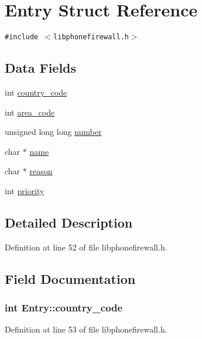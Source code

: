 \hypertarget{structEntry}{
\section{Entry Struct Reference}
\label{structEntry}
}
{\tt \#include $<$libphonefirewall.h$>$}

\subsection*{Data Fields}
\begin{CompactItemize}
\item 
int \hyperlink{structEntry_138b4e79687ff5ff6de4554db0f061fd}{country\_\-code}
\item 
int \hyperlink{structEntry_9de7b96e5b65796bd35e9dc730dcd8b3}{area\_\-code}
\item 
unsigned long long \hyperlink{structEntry_1f2177afed89936f82c130ae13fb107c}{number}
\item 
char $\ast$ \hyperlink{structEntry_272e382d3efed5f970c7939742ec9603}{name}
\item 
char $\ast$ \hyperlink{structEntry_2082cdbb815dfa8b81309cd395d32986}{reason}
\item 
int \hyperlink{structEntry_85af261b3171c257892b54a7200da061}{priority}
\end{CompactItemize}


\subsection{Detailed Description}


Definition at line 52 of file libphonefirewall.h.

\subsection{Field Documentation}
\hypertarget{structEntry_138b4e79687ff5ff6de4554db0f061fd}{
\subsubsection{\setlength{\rightskip}{0pt plus 5cm}int {\bf Entry::country\_\-code}}}
\label{structEntry_138b4e79687ff5ff6de4554db0f061fd}




Definition at line 53 of file libphonefirewall.h.

